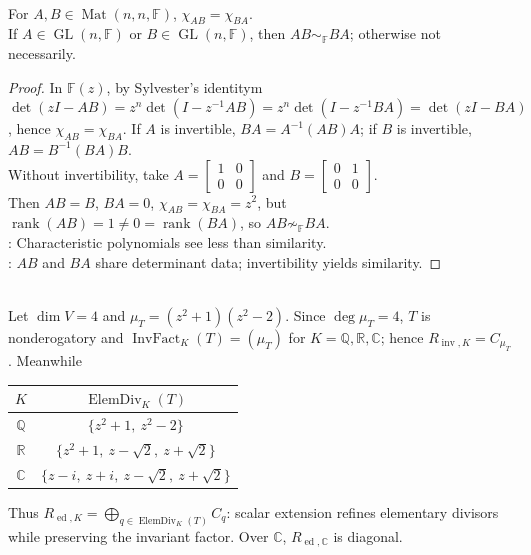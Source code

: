 \begin{proposition} \label{prop:ab-ba-characteristic-polynomial-and-similarity} \\
For $A,B\in\operatorname{Mat}(n,n,\mathbb{F})$, $\chi_{AB}=\chi_{BA}$.\\
If $A\in\operatorname{GL}(n,\mathbb{F})$ or $B\in\operatorname{GL}(n,\mathbb{F})$, then $AB\sim_{\mathbb{F}}BA$; otherwise not necessarily.
\begin{proof}
In $\mathbb{F}(z)$, by Sylvester's identitym $\det(zI-AB)=z^n\det(I-z^{-1}AB)=z^n\det(I-z^{-1}BA)=\det(zI-BA)$, hence $\chi_{AB}=\chi_{BA}$. If $A$ is invertible, $BA=A^{-1}(AB)A$; if $B$ is invertible, $AB=B^{-1}(BA)B$.\\
Without invertibility, take $A=\begin{bmatrix}1&0\\0&0\end{bmatrix}$ and $B=\begin{bmatrix}0&1\\0&0\end{bmatrix}$.\\
Then $AB=B$, $BA=0$, $\chi_{AB}=\chi_{BA}=z^2$, but $\operatorname{rank}(AB)=1\neq0=\operatorname{rank}(BA)$, so $AB\not\sim_{\mathbb{F}}BA$.\\
: Characteristic polynomials see less than similarity.\\
: $AB$ and $BA$ share determinant data; invertibility yields similarity.
\end{proof}
\end{proposition}

\begin{example} \label{ex:base-field-rational-canonical-form-minimal-polynomial} \\
Let $\dim V=4$ and $\mu_T=(z^2+1)(z^2-2)$. Since $\deg\mu_T=4$, $T$ is nonderogatory and $\operatorname{InvFact}_K(T)=(\mu_T)$ for $K=\mathbb{Q},\mathbb{R},\mathbb{C}$; hence $R_{\operatorname{inv},K}=C_{\mu_T}$. Meanwhile
\begin{center}
\begin{tabular}{c|c}
$K$ & $\operatorname{ElemDiv}_K(T)$\\
\hline
$\mathbb{Q}$ & $\{z^2+1,\ z^2-2\}$\\
$\mathbb{R}$ & $\{z^2+1,\ z-\sqrt{2},\ z+\sqrt{2}\}$\\
$\mathbb{C}$ & $\{z-i,\ z+i,\ z-\sqrt{2},\ z+\sqrt{2}\}$
\end{tabular}
\end{center}
Thus $R_{\operatorname{ed},K}=\bigoplus_{q\in\operatorname{ElemDiv}_K(T)}C_q$: scalar extension refines elementary divisors while preserving the invariant factor. Over $\mathbb{C}$, $R_{\operatorname{ed},\mathbb{C}}$ is diagonal.
\end{example}

